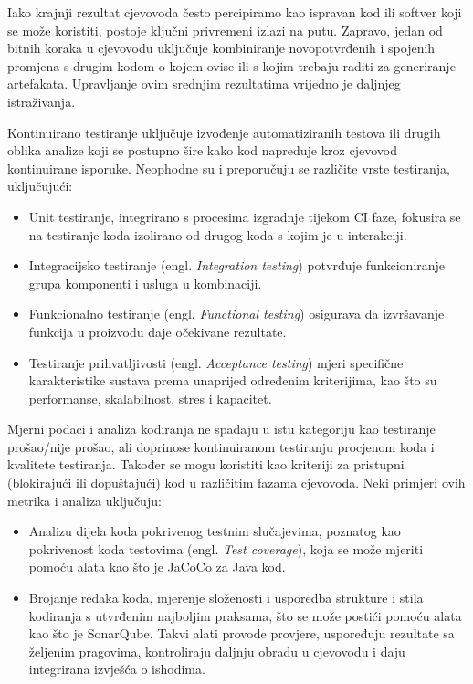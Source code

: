 \documentclass[a4paper,12pt,oneside]{article}
\begin{document}
Iako krajnji rezultat cjevovoda često percipiramo kao ispravan kod ili softver koji se može koristiti, postoje ključni privremeni izlazi na putu. Zapravo, jedan od bitnih koraka u cjevovodu uključuje kombiniranje novopotvrđenih i spojenih promjena s drugim kodom o kojem ovise ili s kojim trebaju raditi za generiranje artefakata. Upravljanje ovim srednjim rezultatima vrijedno je daljnjeg istraživanja.

Kontinuirano testiranje uključuje izvođenje automatiziranih testova ili drugih oblika analize koji se postupno šire kako kod napreduje kroz cjevovod kontinuirane isporuke. Neophodne su i preporučuju se različite vrste testiranja, uključujući:

\begin{itemize}
\item Unit testiranje, integrirano s procesima izgradnje tijekom CI faze, fokusira se na testiranje koda izolirano od drugog koda s kojim je u interakciji.
\item Integracijsko testiranje (engl. \textit{Integration testing}) potvrđuje funkcioniranje grupa komponenti i usluga u kombinaciji.
\item Funkcionalno testiranje (engl. \textit{Functional testing}) osigurava da izvršavanje funkcija u proizvodu daje očekivane rezultate.
\item Testiranje prihvatljivosti (engl. \textit{Acceptance testing}) mjeri specifične karakteristike sustava prema unaprijed određenim kriterijima, kao što su performanse, skalabilnost, stres i kapacitet.
\end{itemize}

Mjerni podaci i analiza kodiranja ne spadaju u istu kategoriju kao testiranje prošao/nije prošao, ali doprinose kontinuiranom testiranju procjenom koda i kvalitete testiranja. Također se mogu koristiti kao kriteriji za pristupni (blokirajući ili dopuštajući) kod u različitim fazama cjevovoda. Neki primjeri ovih metrika i analiza uključuju:

\begin{itemize}
\item Analizu dijela koda pokrivenog testnim slučajevima, poznatog kao pokrivenost koda testovima (engl. \textit{Test coverage}), koja se može mjeriti pomoću alata kao što je JaCoCo za Java kod.
\item Brojanje redaka koda, mjerenje složenosti i usporedba strukture i stila kodiranja s utvrđenim najboljim praksama, što se može postići pomoću alata kao što je SonarQube. Takvi alati provode provjere, uspoređuju rezultate sa željenim pragovima, kontroliraju daljnju obradu u cjevovodu i daju integrirana izvješća o ishodima.

\end{itemize}
\end{document}
